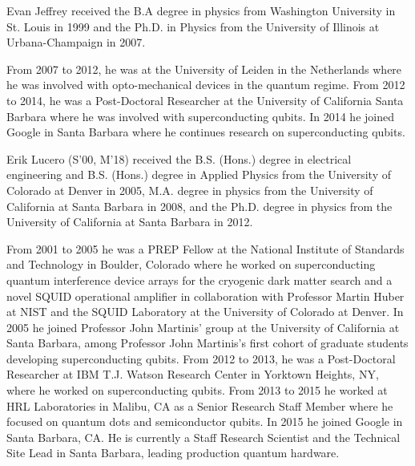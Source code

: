 \documentclass[journal]{IEEEtran}
\begin{document}
\begin{IEEEbiography}
{Evan Jeffrey}  received the B.A degree in physics from Washington University in St. Louis in 1999 and the Ph.D. in Physics from the University of Illinois at Urbana-Champaign in 2007.

From 2007 to 2012, he was at the University of Leiden in the Netherlands where he was involved with opto-mechanical devices in the quantum regime.  From 2012 to 2014, he was a Post-Doctoral Researcher at the University of California Santa Barbara where he was involved with superconducting qubits.  In 2014 he joined Google in Santa Barbara where he continues research on superconducting qubits.
\end{IEEEbiography}
\begin{IEEEbiography}{Erik Lucero}
(S’00, M’18) received the B.S. (Hons.) degree in electrical engineering and B.S. (Hons.) degree in Applied Physics from the University of Colorado at Denver in 2005, M.A. degree in physics from the University of California at Santa Barbara in 2008, and the Ph.D. degree in physics from the University of California at Santa Barbara in 2012.

From 2001 to 2005 he was a PREP Fellow at the National Institute of Standards and Technology in Boulder, Colorado where he worked on superconducting quantum interference device arrays for the cryogenic dark matter search and a novel SQUID operational amplifier in collaboration with Professor Martin Huber at NIST and the SQUID Laboratory at the University of Colorado at Denver. In 2005 he joined Professor John Martinis’ group at the University of California at Santa Barbara, among Professor John Martinis’s first cohort of graduate students developing superconducting qubits. From 2012 to 2013, he was a Post-Doctoral Researcher at IBM T.J. Watson Research Center in Yorktown Heights, NY, where he worked on superconducting qubits. From 2013 to 2015 he worked at HRL Laboratories in Malibu, CA as a Senior Research Staff Member where he focused on quantum dots and semiconductor qubits. In 2015 he joined Google in Santa Barbara, CA. He is currently a Staff Research Scientist and the Technical Site Lead in Santa Barbara, leading production quantum hardware.
\end{IEEEbiography}
\end{document}
